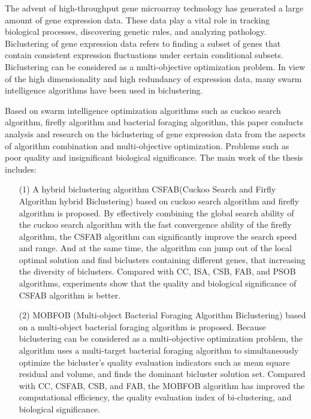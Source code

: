 \begin{eabstract}
  The advent of high-throughput gene microarray technology has generated a large amount of gene expression data. These data play a vital role in tracking biological processes, discovering genetic rules, and analyzing pathology. Biclustering of gene expression data refers to finding a subset of genes that contain consistent expression fluctuations under certain conditional subsets. Biclustering can be considered as a multi-objective optimization problem. In view of the high dimensionality and high redundancy of expression data, many swarm intelligence algorithms have been used in biclustering.

  Based on swarm intelligence optimization algorithms such as cuckoo search algorithm, firefly algorithm and bacterial foraging algorithm, this paper conducts analysis and research on the biclustering of gene expression data from the aspects of algorithm combination and multi-objective optimization. Problems such as poor quality and insignificant biological significance. The main work of the thesis includes:
  
  \begin{itemize}
    \item[(1)] {  A hybrid biclustering algorithm CSFAB(Cuckoo Search and Firfly Algorithm hybrid Biclustering) based on cuckoo search algorithm and firefly algorithm is proposed. By effectively combining the global search ability of the cuckoo search algorithm with the fast convergence ability of the firefly algorithm, the CSFAB algorithm can significantly improve the search speed and range. And at the same time, the algorithm can jump out of the local optimal solution and find biclusters containing different genes, that increasing the diversity of biclusters. Compared with CC, ISA, CSB, FAB, and PSOB algorithms, experiments show that the quality and biological significance of CSFAB algorithm is better.}
    \item[(2)] { MOBFOB (Multi-object Bacterial Foraging Algorithm Biclustering) based on a multi-object bacterial foraging algorithm is proposed. Because biclustering can be considered as a multi-objective optimization problem, the algorithm uses a multi-target bacterial foraging algorithm to simultaneously optimize the bicluster's quality evaluation indicators such as mean square residual and volume, and finds the dominant bicluster solution set. Compared with CC, CSFAB, CSB, and FAB, the MOBFOB algorithm has improved the computational efficiency, the quality evaluation index of bi-clustering, and biological significance.}
  \end{itemize}


\end{eabstract}